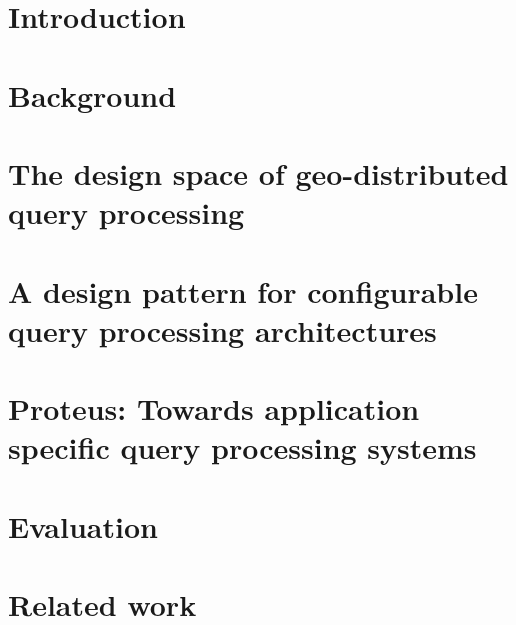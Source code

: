 \maketitle

\chapter{Introduction}
\label{ch:intro}


\chapter{Background}
\label{ch:background}


\chapter{The design space of geo-distributed query processing}
\label{ch:design_space}


\chapter{A design pattern for configurable query processing architectures}
\label{ch:design_pattern}


\chapter{Proteus: Towards application specific query processing systems}
\label{ch:proteus}


\chapter{Evaluation}
\label{ch:evaluation}


\chapter{Related work}
\label{ch:related_work}

